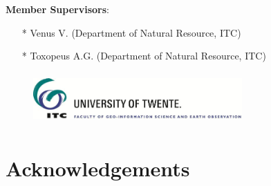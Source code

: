 \documentclass[10pt, a4paper]{article}
\begin{document}
\textbf{Member Supervisors}: 
\begin{itemize}
	\item[*] Venus V. (Department of Natural Resource, ITC)
	\item[*] Toxopeus A.G. (Department of Natural Resource, ITC)
\end{itemize}

\begin{figure}[h]
	\begin{center}
	\includegraphics[height=2cm,width=8cm]{ITC-logo.jpg}
	\end{center}
\end{figure}
\pagebreak

\section*{}
	\tableofcontents 
\pagebreak

\section*{Acknowledgements}
\end{document}
